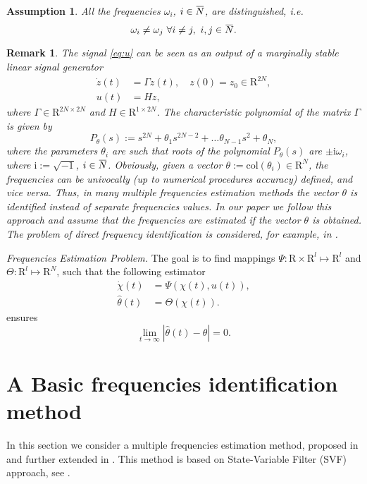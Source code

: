 \documentclass[journal, onecolumn]{IEEEtran}
\newtheorem{assumption}{Assumption}
\newtheorem{remark}{Remark}
\newcommand{\overbar}[1]{\mkern 1.5mu\overline{\mkern-1.5mu#1\mkern-1.5mu}\mkern 1.5mu}
\newcommand{\rea}{\mathrm{R}}
\newcommand{\img}{\mathrm{i}}
\newcommand{\col}[1]{\mathrm{col}(#1)}
\newcommand{\iinb}{i\in\overbar{N}}
\newcommand{\hth}{\hat{\theta}}
\begin{document}
\begin{assumption} \label{as:as1}
All the frequencies $\omega_i$, $\iinb$, are distinguished, i.e.
\[
	\omega_i \ne \omega_j \  \forall i\ne j, \  i,j\in\overbar{N}.
\]
\end{assumption}

\begin{remark} \label{rem:theta}
The signal \eqref{eq:u} can be seen as an output of a marginally stable linear signal generator 
\[
	\begin{aligned}
		\dot{z}(t) &= \Gamma z(t), \quad z(0)=z_0\in\rea^{2N},\\
		u(t) &= Hz,
	\end{aligned}
\]
where $\Gamma \in \rea^{2N\times 2N}$ and $H\in \rea^{1\times 2N}$. The characteristic polynomial of the matrix $\Gamma$ is given by 
\begin{equation*}
	P_\theta(s):= s^{2N} + \theta_1 s^{2N-2} + \ldots \theta_{N-1}s^2 + \theta_N,
\end{equation*}
where the parameters $\theta_i$ are such that roots of the polynomial $P_\theta(s)$ are $\pm \img \omega_i$, where $\img:=\sqrt{-1}$, $\iinb$. Obviously, given a vector $\theta:=\col{\theta_i}\in\rea^N$, the frequencies can be univocally (up to numerical procedures accuracy) defined, and \emph{vice versa}. Thus, in many multiple frequencies estimation methods the vector $\theta$ is identified instead of separate frequencies values. In our paper we follow this approach and assume that the frequencies are estimated if the vector $\theta$ is obtained. The problem of \emph{direct} frequency identification is considered, for example, in  \cite{Pin2015Direct}.
\end{remark}

\emph{Frequencies Estimation Problem.} The goal is to find mappings $\Psi:\rea \times \rea^{l} \mapsto \rea^l$ and $\Theta: \rea^l\mapsto\rea^N$, such that the following estimator 
\begin{equation} \label{eq:estim}
	\begin{aligned}
		\dot\chi(t) &= \Psi(\chi(t), u(t)), \\
		\hth(t) &= \Theta(\chi(t)).
	\end{aligned}
\end{equation}
ensures
\begin{equation} \label{eq:goal}
	\lim_{t\to\infty}|\hth(t)-\theta|=0.
\end{equation}

\section{A Basic frequencies identification method} \label{sec:basic}
In this section we consider a multiple frequencies estimation method, proposed in \cite{aranovskiy2010identification} and further extended in \cite{bobtsov2012switched, pyrkin2015estimation}. This method is based on State-Variable Filter (SVF) approach, see \cite{young1981parameter, Garnier2003SVF}. 
\end{document}
